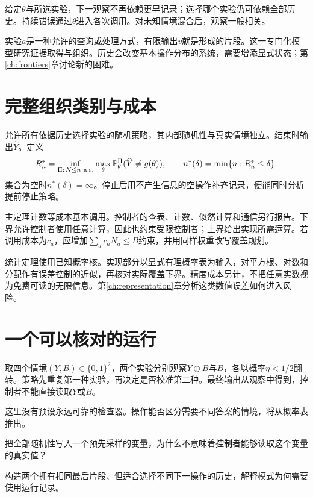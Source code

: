 给定$\theta$与所选实验，下一观察不再依赖更早记录；选择哪个实验仍可依赖全部历史。持续错误通过$\theta$进入各次调用。对未知情境混合后，观察一般相关。

实验$a$是一种允许的查询或处理方式，有限输出$v$就是形成的片段。这一专门化模型研究证据取得与组织。历史会改变基本操作分布的系统，需要增添显式状态；第\ref{ch:frontiers}章讨论新的困难。

\section{完整组织类别与成本}
允许所有依据历史选择实验的随机策略，其内部随机性与真实情境独立。结束时输出$\widehat Y$。定义
\[
 R_n^*=\inf_{\Pi:\,N\le n\ \mathrm{a.s.}}
 \max_\theta\mathbb P_\theta^\Pi(\widehat Y\ne g(\theta)),
 \qquad n^*(\delta)=\min\{n:R_n^*\le\delta\}.
\]
集合为空时$n^*(\delta)=\infty$。停止后用不产生信息的空操作补齐记录，便能同时分析提前停止策略。

主定理计数等成本基本调用。控制者的查表、计数、似然计算和通信另行报告。下界允许控制者使用任意计算，因此也约束受限控制者；上界给出实现所需运算。若调用成本为$c_a$，应增加$\sum_ac_aN_a\le B$约束，并用同样权重改写覆盖规划。

统计定理使用已知概率核。实现部分以显式有理概率表为输入，对平方根、对数和分配作有误差控制的近似，再核对实际覆盖下界。精度成本另计，不把任意实数视为免费可读的无限信息。第\ref{ch:representation}章分析这类数值误差如何进入风险。

\section{一个可以核对的运行}
取四个情境$(Y,B)\in\{0,1\}^2$，两个实验分别观察$Y\oplus B$与$B$，各以概率$\eta<1/2$翻转。策略先重复第一种实验，再决定是否校准第二种。最终输出从观察中得到，控制者不能直接读取$Y$或$B$。

这里没有预设永远可靠的检查器。操作能否区分需要不同答案的情境，将从概率表推出。
\begin{exercise}把全部随机性写入一个预先采样的变量，为什么不意味着控制者能够读取这个变量的真实值？\end{exercise}
\begin{exercise}构造两个拥有相同最后片段、但适合选择不同下一操作的历史，解释模式为何需要使用运行记录。\end{exercise}
